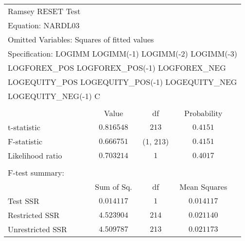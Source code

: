 \begin{tabular}{lrrrr}
\multicolumn{1}{l}{Ramsey RESET Test}&\multicolumn{1}{c}{}&\multicolumn{1}{c}{}&\multicolumn{1}{c}{}&\multicolumn{1}{c}{}\\
\multicolumn{1}{l}{Equation: NARDL03}&\multicolumn{1}{c}{}&\multicolumn{1}{c}{}&\multicolumn{1}{c}{}&\multicolumn{1}{c}{}\\
\multicolumn{3}{l}{Omitted Variables: Squares of fitted values}&\multicolumn{1}{c}{}&\multicolumn{1}{c}{}\\
\multicolumn{5}{l}{Specification: LOGIMM LOGIMM(-1) LOGIMM(-2) LOGIMM(-3)}\\
\multicolumn{5}{l}{LOGFOREX\_POS LOGFOREX\_POS(-1) LOGFOREX\_NEG}\\
\multicolumn{5}{l}{LOGEQUITY\_POS LOGEQUITY\_POS(-1) LOGEQUITY\_NEG}\\
\multicolumn{2}{l}{LOGEQUITY\_NEG(-1) C}&\multicolumn{1}{c}{}&\multicolumn{1}{c}{}&\multicolumn{1}{c}{}\\
[4.5pt] \hline \\ [-4.5pt]
\multicolumn{1}{c}{}&\multicolumn{1}{c}{Value}&\multicolumn{1}{c}{df}&\multicolumn{1}{c}{Probability}&\multicolumn{1}{c}{}\\
\multicolumn{1}{l}{t-statistic}&\multicolumn{1}{c}{$0.816548$}&\multicolumn{1}{c}{$213$}&\multicolumn{1}{c}{$0.4151$}&\multicolumn{1}{c}{}\\
\multicolumn{1}{l}{F-statistic}&\multicolumn{1}{c}{$0.666751$}&\multicolumn{1}{c}{(1, 213)}&\multicolumn{1}{c}{$0.4151$}&\multicolumn{1}{c}{}\\
\multicolumn{1}{l}{Likelihood ratio}&\multicolumn{1}{c}{$0.703214$}&\multicolumn{1}{c}{$1$}&\multicolumn{1}{c}{$0.4017$}&\multicolumn{1}{c}{}\\
[4.5pt] \hline \\ [-4.5pt]
\multicolumn{1}{l}{F-test summary:}&\multicolumn{1}{c}{}&\multicolumn{1}{c}{}&\multicolumn{1}{c}{}&\multicolumn{1}{c}{}\\
\multicolumn{1}{c}{}&\multicolumn{1}{c}{Sum of Sq.}&\multicolumn{1}{c}{df}&\multicolumn{1}{c}{Mean Squares}&\multicolumn{1}{c}{}\\
\multicolumn{1}{l}{Test SSR}&\multicolumn{1}{c}{$0.014117$}&\multicolumn{1}{c}{$1$}&\multicolumn{1}{c}{$0.014117$}&\multicolumn{1}{c}{}\\
\multicolumn{1}{l}{Restricted SSR}&\multicolumn{1}{c}{$4.523904$}&\multicolumn{1}{c}{$214$}&\multicolumn{1}{c}{$0.021140$}&\multicolumn{1}{c}{}\\
\multicolumn{1}{l}{Unrestricted SSR}&\multicolumn{1}{c}{$4.509787$}&\multicolumn{1}{c}{$213$}&\multicolumn{1}{c}{$0.021173$}&\multicolumn{1}{c}{}\\

\end{tabular}
